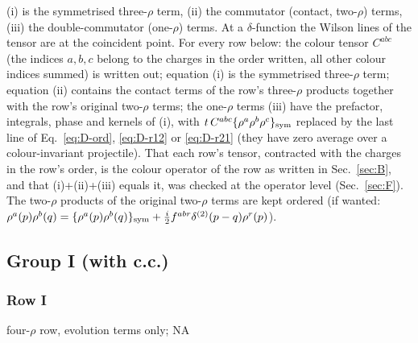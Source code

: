 (i) is the symmetrised three-$\rho$ term, (ii) the commutator (contact, two-$\rho$) terms, (iii) the double-commutator (one-$\rho$) terms. At a $\delta$-function the Wilson lines of the tensor are at the coincident point. For every row below: the colour tensor $C^{abc}$ (the indices $a,b,c$ belong to the charges in the order written, all other colour indices summed) is written out; equation (i) is the symmetrised three-$\rho$ term; equation (ii) contains the contact terms of the row's three-$\rho$ products together with the row's original two-$\rho$ terms; the one-$\rho$ terms (iii) have the prefactor, integrals, phase and kernels of (i), with $t\,C^{abc}\{\rho^{a}\rho^{b}\rho^{c}\}_{\rm sym}$ replaced by the last line of Eq.~\eqref{eq:D-ord}, \eqref{eq:D-r12} or \eqref{eq:D-r21} (they have zero average over a colour-invariant projectile). That each row's tensor, contracted with the charges in the row's order, is the colour operator of the row as written in Sec.~\ref{sec:B}, and that (i)+(ii)+(iii) equals it, was checked at the operator level (Sec.~\ref{sec:F}). The two-$\rho$ products of the original two-$\rho$ terms are kept ordered (if wanted: $\rho^{a}(p)\rho^{b}(q)=\{\rho^{a}(p)\rho^{b}(q)\}_{\rm sym}+\frac{i}{2}f^{abr}\delta^{(2)}(p-q)\rho^{r}(p)$).
\subsection{Group I (with c.c.)}
\subsubsection*{Row I}
four-$\rho$ row, evolution terms only; \textsc{NA}
